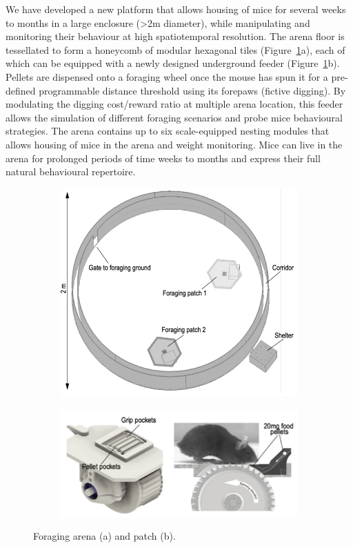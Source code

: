 We have developed a new platform that allows housing of mice for several weeks
to months in a large enclosure (\textgreater 2m diameter), while manipulating and
monitoring their behaviour at high spatiotemporal resolution. The arena floor
is tessellated to form a honeycomb of modular hexagonal tiles
(Figure~\ref{fig:arena}a), each of which can be equipped with a newly designed
underground feeder (Figure~\ref{fig:arena}b). Pellets are dispensed onto a
foraging wheel once the mouse has spun it for a pre-defined programmable
distance threshold using its forepaws (fictive digging). By modulating the
digging cost/reward ratio at multiple arena location, this feeder allows the
simulation of different foraging scenarios and probe mice behavioural
strategies. The arena contains up to six scale-equipped nesting modules that
allows housing of mice in the arena and weight monitoring. Mice can live in the
arena for prolonged periods of time weeks to months and express their full
natural behavioural repertoire.

\begin{figure}
    \begin{subfigure}{\textwidth}
        \centering
        \includegraphics[width=4in]{figures/arena.png}
        \caption{}
    \end{subfigure}
    \par\bigskip
    \begin{subfigure}{\textwidth}
        \centering
        \includegraphics[width=4in]{figures/patch.png}
        \caption{}
    \end{subfigure}
    \caption{Foraging arena (a) and patch (b).}
    \label{fig:arena}
\end{figure}

